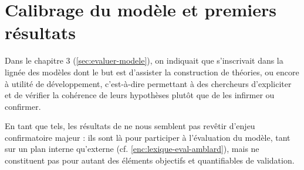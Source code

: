 \clearpage
\section{Calibrage du modèle et premiers résultats}

Dans le chapitre 3 (\cref{sec:evaluer-modele}), on indiquait que \simfeodal{} s'inscrivait dans la lignée des modèles dont le but est d'\og assister la construction de théories\fg{}, ou encore \og à utilité de développement\fg{}, c'est-à-dire permettant à des chercheurs d'expliciter et de vérifier la cohérence de leurs hypothèses plutôt que de les infirmer ou confirmer.

En tant que tels, les résultats de \simfeodal{} ne nous semblent pas revêtir d'enjeu confirmatoire majeur : ils sont là pour participer à l'évaluation du modèle, tant sur un plan interne qu'externe (cf. \cref{enc:lexique-eval-amblard}), mais ne constituent pas pour autant des éléments objectifs et quantifiables de validation.

